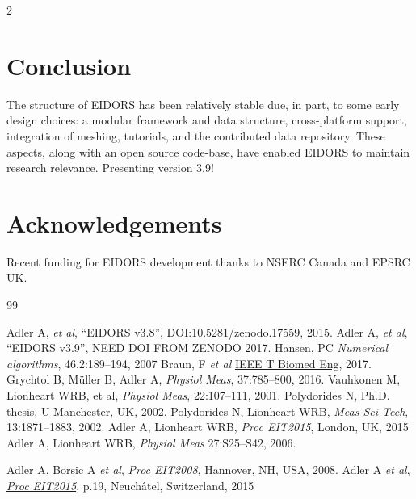 \documentclass[10pt,letterpaper]{article}
\renewenvironment{thebibliography}[1]{%
    \begin{oldthebibliography}{#1}%
      \setlength{\parskip}{0ex}%
      \setlength{\itemsep}{0ex}%
  }%
  {%
    \end{oldthebibliography}%
  }
\begin{document}
\begin{multicols}{2}
\section{Conclusion}
The structure of EIDORS has been relatively stable due, in part, to some early design choices:
a modular framework and data structure,
cross-platform support, integration of meshing,
tutorials, and the contributed data repository.
These aspects, along with an open source code-base, have enabled EIDORS to
maintain research relevance.
Presenting version 3.9!


\section*{Acknowledgements}
Recent funding for EIDORS development thanks to
NSERC Canada and EPSRC UK.

\footnotesize
\begin{thebibliography}{99}
   Adler A, {\em et al}, ``EIDORS v3.8'',
   \href{http://dx.doi.org/10.5281/zenodo.17559}{DOI:10.5281/zenodo.17559},
    2015.
   Adler A, {\em et al}, ``EIDORS v3.9'',
   NEED DOI FROM ZENODO
    2017.
   Hansen, PC {\em Numerical algorithms}, 46.2:189--194, 2007
   Braun, F {\em et al} \href{http://dx.doi.org/10.1109/TBME.2017.2659540}{IEEE T Biomed Eng}, 2017.
   Grychtol B, Müller B, Adler A,
   {\em Physiol Meas}, 37:785--800, 2016.
   Vauhkonen M, Lionheart WRB,  et al,
   {\em  Physiol Meas}, 22:107--111, 2001.
   Polydorides N,
 Ph.D. thesis, U Manchester, UK, 2002.
   Polydorides N, Lionheart WRB,
   {\em Meas Sci Tech}, 13:1871--1883, 2002.
Adler A, Lionheart WRB,
{\em Proc EIT2015}, London, UK, 2015
%
Adler A, Lionheart WRB,
{\em Physiol Meas} 27:S25--S42, 2006.

Adler A, Borsic A {\em et al},
{\em Proc EIT2008}, Hannover, NH, USA, 2008.
Adler A {\em et al}, %
\href{https://zenodo.org/record/17752}{\em Proc EIT2015}, p.19, 
 Neuchâtel, Switzerland, 2015
\end{thebibliography}
\end{multicols}
\end{document}
